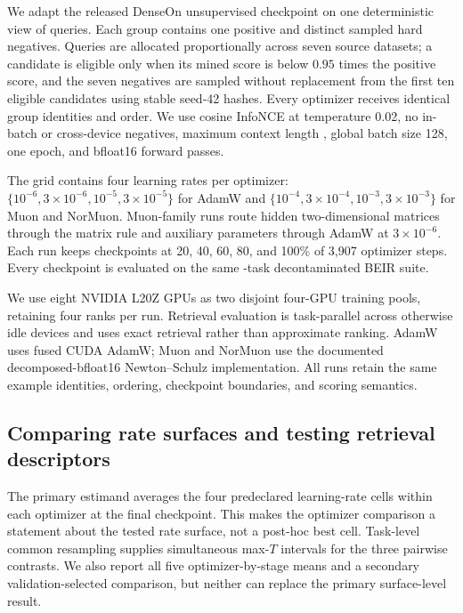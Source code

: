 \documentclass[11pt]{article}
\begin{document}
We adapt the released DenseOn unsupervised checkpoint on one deterministic view of
\NumTrainingQueries{} queries. Each group contains one positive and \NumHardNegatives{} distinct
sampled hard negatives. Queries are allocated proportionally across seven source datasets; a
candidate is eligible only when its mined score is below $0.95$ times the positive score, and the
seven negatives are sampled without replacement from the first ten eligible candidates using
stable seed-42 hashes. Every optimizer receives identical group identities and order. We use cosine
InfoNCE at temperature 0.02, no in-batch or cross-device negatives, maximum context length
\ContextLength{}, global batch size 128, one epoch, and bfloat16 forward passes.

The grid contains four learning rates per optimizer: $\{10^{-6},3\!\times\!10^{-6},10^{-5},
3\!\times\!10^{-5}\}$ for AdamW and $\{10^{-4},3\!\times\!10^{-4},10^{-3},3\!\times\!10^{-3}\}$
for Muon and NorMuon. Muon-family runs route hidden two-dimensional matrices through the matrix
rule and auxiliary parameters through AdamW at $3\!\times\!10^{-6}$. Each run keeps checkpoints at
20, 40, 60, 80, and 100\% of 3,907 optimizer steps. Every checkpoint is evaluated on the same
\NumBEIRTasks-task decontaminated BEIR suite.

We use eight NVIDIA L20Z GPUs as two disjoint four-GPU training pools, retaining four ranks per
run. Retrieval evaluation is task-parallel across otherwise idle devices and uses exact retrieval
rather than approximate ranking. AdamW uses fused CUDA AdamW; Muon and NorMuon use the documented
decomposed-bfloat16 Newton--Schulz implementation. All runs retain the same example identities,
ordering, checkpoint boundaries, and scoring semantics.

\subsection{Comparing rate surfaces and testing retrieval descriptors}

The primary estimand averages the four predeclared learning-rate cells within each optimizer at the
final checkpoint. This makes the optimizer comparison a statement about the tested rate surface,
not a post-hoc best cell. Task-level common resampling supplies simultaneous max-$T$ intervals for
the three pairwise contrasts. We also report all five optimizer-by-stage means and a secondary
validation-selected comparison, but neither can replace the primary surface-level result.
\end{document}
